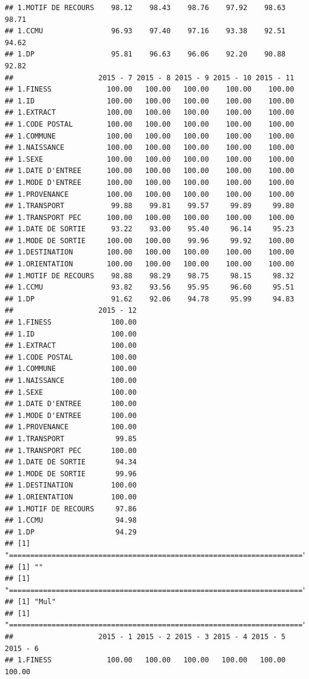 \documentclass[]{article}
\begin{document}
\begin{verbatim}
## 1.MOTIF DE RECOURS    98.12    98.43    98.76    97.92    98.63    98.71
## 1.CCMU                96.93    97.40    97.16    93.38    92.51    94.62
## 1.DP                  95.81    96.63    96.06    92.20    90.88    92.82
##                    2015 - 7 2015 - 8 2015 - 9 2015 - 10 2015 - 11
## 1.FINESS             100.00   100.00   100.00    100.00    100.00
## 1.ID                 100.00   100.00   100.00    100.00    100.00
## 1.EXTRACT            100.00   100.00   100.00    100.00    100.00
## 1.CODE POSTAL        100.00   100.00   100.00    100.00    100.00
## 1.COMMUNE            100.00   100.00   100.00    100.00    100.00
## 1.NAISSANCE          100.00   100.00   100.00    100.00    100.00
## 1.SEXE               100.00   100.00   100.00    100.00    100.00
## 1.DATE D'ENTREE      100.00   100.00   100.00    100.00    100.00
## 1.MODE D'ENTREE      100.00   100.00   100.00    100.00    100.00
## 1.PROVENANCE         100.00   100.00   100.00    100.00    100.00
## 1.TRANSPORT           99.88    99.81    99.57     99.89     99.80
## 1.TRANSPORT PEC      100.00   100.00   100.00    100.00    100.00
## 1.DATE DE SORTIE      93.22    93.00    95.40     96.14     95.23
## 1.MODE DE SORTIE     100.00   100.00    99.96     99.92    100.00
## 1.DESTINATION        100.00   100.00   100.00    100.00    100.00
## 1.ORIENTATION        100.00   100.00   100.00    100.00    100.00
## 1.MOTIF DE RECOURS    98.88    98.29    98.75     98.15     98.32
## 1.CCMU                93.82    93.56    95.95     96.60     95.51
## 1.DP                  91.62    92.06    94.78     95.99     94.83
##                    2015 - 12
## 1.FINESS              100.00
## 1.ID                  100.00
## 1.EXTRACT             100.00
## 1.CODE POSTAL         100.00
## 1.COMMUNE             100.00
## 1.NAISSANCE           100.00
## 1.SEXE                100.00
## 1.DATE D'ENTREE       100.00
## 1.MODE D'ENTREE       100.00
## 1.PROVENANCE          100.00
## 1.TRANSPORT            99.85
## 1.TRANSPORT PEC       100.00
## 1.DATE DE SORTIE       94.34
## 1.MODE DE SORTIE       99.96
## 1.DESTINATION         100.00
## 1.ORIENTATION         100.00
## 1.MOTIF DE RECOURS     97.86
## 1.CCMU                 94.98
## 1.DP                   94.29
## [1] "====================================================================="
## [1] ""
## [1] "====================================================================="
## [1] "Mul"
## [1] "====================================================================="
##                    2015 - 1 2015 - 2 2015 - 3 2015 - 4 2015 - 5 2015 - 6
## 1.FINESS             100.00   100.00   100.00   100.00   100.00   100.00

\end{verbatim}
\end{document}
